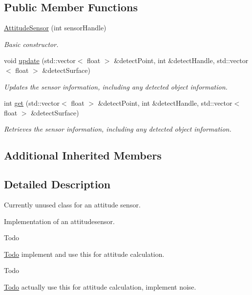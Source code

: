 \subsection*{Public Member Functions}
\begin{DoxyCompactItemize}
\item 
\hyperlink{classAttitudeSensor_ada1382f003b390e357e9617e00299ddd}{Attitude\+Sensor} (int sensor\+Handle)
\begin{DoxyCompactList}\small\item\em Basic constructor. \end{DoxyCompactList}\item 
void \hyperlink{classAttitudeSensor_a5015e591534c5e80bd6646cc4719b417}{update} (std\+::vector$<$ float $>$ \&detect\+Point, int \&detect\+Handle, std\+::vector$<$ float $>$ \&detect\+Surface)
\begin{DoxyCompactList}\small\item\em Updates the sensor information, including any detected object information. \end{DoxyCompactList}\item 
int \hyperlink{classAttitudeSensor_a29d069767d7b3b36a998ae70764134dd}{get} (std\+::vector$<$ float $>$ \&detect\+Point, int \&detect\+Handle, std\+::vector$<$ float $>$ \&detect\+Surface)
\begin{DoxyCompactList}\small\item\em Retrieves the sensor information, including any detected object information. \end{DoxyCompactList}\end{DoxyCompactItemize}
\subsection*{Additional Inherited Members}


\subsection{Detailed Description}
Currently unused class for an attitude sensor. 

Implementation of an attitudesensor.

\begin{DoxyRefDesc}{Todo}
\item[\hyperlink{todo__todo000001}{Todo}]implement and use this for attitude calculation. \end{DoxyRefDesc}


\begin{DoxyRefDesc}{Todo}
\item[\hyperlink{todo__todo000002}{Todo}]actually use this for attitude calculation, implement noise. \end{DoxyRefDesc}


